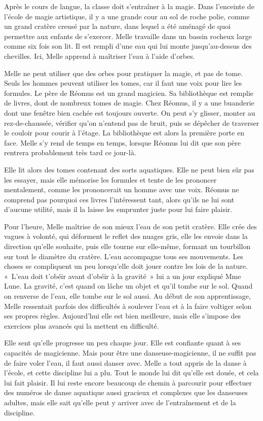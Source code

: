 Après le cours de langue, la classe doit s'entraîner à la magie. Dans l'enceinte de l'école de magie artistique, il y a une grande cour au sol de roche polie, comme un grand cratère creusé par la nature, dans lequel a été aménagé de quoi permettre aux enfants de s'exercer. Melle travaille dans un bassin rocheux large comme six fois son lit. Il est rempli d'une eau qui lui monte jusqu'au-dessus des chevilles. Ici, Melle apprend à maîtriser l'eau à l'aide d'orbes.

Melle ne peut utiliser que des orbes pour pratiquer la magie, et pas de tome. Seuls les hommes peuvent utiliser les tomes, car il faut une voix pour lire les formules. Le père de Réomus est un grand magicien. Sa bibliothèque est remplie de livres, dont de nombreux tomes de magie. Chez Réomus, il y a une buanderie dont une fenêtre bien cachée est toujours ouverte. On peut s'y glisser, monter au rez-de-chaussée, vérifier qu'on n'entend pas de bruit, puis se dépêcher de traverser le couloir pour courir à l'étage. La bibliothèque est alors la première porte en face. Melle s'y rend de temps en temps, lorsque Réomus lui dit que son père rentrera probablement très tard ce jour-là.

Elle lit alors des tomes contenant des sorts aquatiques. Elle ne peut bien sûr pas les essayer, mais elle mémorise les formules et tente de les prononcer mentalement, comme les prononcerait un homme avec une voix. Réomus ne comprend pas pourquoi ces livres l'intéressent tant, alors qu'ils ne lui sont d'aucune utilité, mais il la laisse les emprunter juste pour lui faire plaisir.

Pour l'heure, Melle maîtrise de son mieux l'eau de son petit cratère. Elle crée des vagues à volonté, qui déforment le reflet des nuages gris, elle les envoie dans la direction qu'elle souhaite, puis elle tourne sur elle-même, formant un tourbillon sur tout le diamètre du cratère. L'eau accompagne tous ses mouvements. Les choses se compliquent un peu lorsqu'elle doit jouer contre les lois de la nature. «~L'eau doit t'obéir avant d'obéir à la gravité~» lui a un jour expliqué Mme Lune. La gravité, c'est quand on lâche un objet et qu'il tombe sur le sol. Quand on renverse de l'eau, elle tombe sur le sol aussi. Au début de son apprentissage, Melle ressentait parfois des difficultés à soulever l'eau et à la faire voltiger selon ses propres règles. Aujourd'hui elle est bien meilleure, mais elle s'impose des exercices plus avancés qui la mettent en difficulté.

Elle sent qu'elle progresse un peu chaque jour. Elle est confiante quant à ses capacités de magicienne. Mais pour être une danseuse-magicienne, il ne suffit pas de faire voler l'eau, il faut aussi danser avec. Melle a tout appris de la danse à l'école, et cette discipline lui a plu. Tout le monde lui dit qu'elle est douée, et cela lui fait plaisir. Il lui reste encore beaucoup de chemin à parcourir pour effectuer des numéros de danse aquatique aussi gracieux et complexes que les danseuses adultes, mais elle sait qu'elle peut y arriver avec de l'entraînement et de la discipline.

